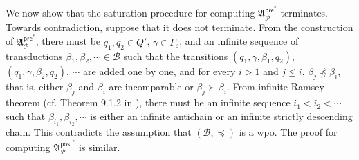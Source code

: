 \documentclass[preprint,12pt]{elsarticle}
\newcommand\Pp{{\mathcal{P} }}
\newcommand\pre{{\mathsf{pre} }}
\newcommand\post{{\mathsf{post} }}
\newcommand\Aut{{\mathfrak{A} }}
\newcommand\TranSet{{\mathscr{T} }}
\newcommand\Tranbasis{{\mathscr{B} }}
\begin{document}
We now show that the saturation procedure for computing $\Aut^{\pre^*}_{\Pp}$ terminates. 
%
Towards contradiction, suppose that 
it does not terminate. From the construction of $\Aut^{\pre^*}_{\Pp}$, there must be $q_1, q_2 \in Q'$, $\gamma \in \Gamma_\varepsilon$, and an infinite sequence of transductions $\beta_1, \beta_2, \cdots \in \Tranbasis$ such that the transitions $(q_1, \gamma, \beta_1, q_2) $, $(q_1, \gamma, \beta_2, q_2) $, $\cdots$ are added one by one,  and for every $i > 1$ and $j \le i$, $\beta_j \not \preceq \beta_i$,  that is, either $\beta_j$ and $\beta_i$ are incomparable or $\beta_j \succ \beta_i$. From infinite Ramsey theorem (cf. Theorem 9.1.2 in \cite{Rein00}), there must be an infinite sequence $i_1 < i_2 < \cdots$ such that $\beta_{i_1}, \beta_{i_2}, \cdots$ is either an infinite antichain or an infinite strictly descending chain. This contradicts the assumption that $(\Tranbasis, \preceq)$ is a wpo. 
The proof for computing $\Aut^{\post^*}_{\Pp}$ is similar.
\end{document}
